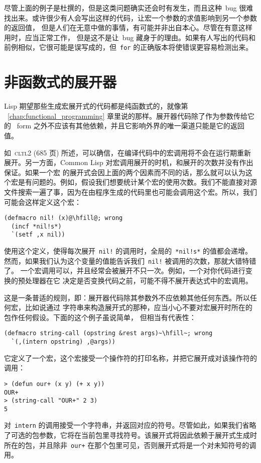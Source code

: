 尽管上面的例子是杜撰的，但是这类问题确实还会时有发生，而且这种~bug
很难找出来。或许很少有人会写出这样的代码，让宏一个参数的求值影响到另一个参数的返回值，
但是人们在无意中做的事情，有可能并非出自本心。尽管在有意这样用时，应当正常工作，
但是这不是让~bug 藏身于\utility{}的理由。如果有人写出的代码和前例相似，它很可能是误写成的，但~\texttt{for}
的正确版本将使错误更容易检测出来。

\section{非函数式的展开器}
\label{sec:non-functional_expanders}

Lisp 期望那些生成宏展开式的代码都是纯函数式的，就像第%
~\ref{chap:functional_programming} 章里说的那样。展开器代码除了作为参数传给它的
~form 之外不应该有其他依赖，并且它影响外界的唯一渠道只能是它的返回值。

如~\textsc{cltl}2 (685 页) 所述，可以确信，在编译代码中的宏调用将不会在运行期重新
展开。另一方面，Common Lisp 对宏调用展开的时机，和展开的次数并没有作出保证。如果一个宏
的展开式会因上面的两个因素而不同的话，那么就可以认为这个宏是有问题的。例如，假设我们想要统计某个宏的使用次数。我们不能直接对源文件搜索一遍了事，因为在由程序生成的代码里也可能会调用这个宏。所以，我们
可能会这样定义这个宏：
\begin{lstlisting}[escapechar=\@]
(defmacro nil! (x)@\hfill@; wrong
  (incf *nil!s*)
  `(setf ,x nil))
\end{lstlisting}
使用这个定义，使得每次展开~\verb|nil!| 的调用时，全局的~\verb|*nil!s*| 的值都会递增。
然而，如果我们认为这个变量的值能告诉我们~\verb|nil!| 被调用的次数，那就大错特错了。
一个宏调用可以，并且经常会被展开不只一次。例如，一个对你代码进行变换的预处理器在它
决定是否变换代码之前，可能不得不展开表达式中的宏调用。

这是一条普适的规则，即：展开器代码除其参数外不应依赖其他任何东西。所以任何宏，比如说通过
字符串来构造展开式的那种，应当小心不要对宏展开时所在的包作任何假设。下面的这个例子虽说简单，
但相当有代表性：
\begin{lstlisting}[escapechar=\~]
(defmacro string-call (opstring &rest args)~\hfill~; wrong
  `(,(intern opstring) ,@args))
\end{lstlisting}
它定义了一个宏，这个宏接受一个操作符的打印名称，并把它展开成对该操作符的调用：
\begin{lstlisting}
> (defun our+ (x y) (+ x y))
OUR+
> (string-call "OUR+" 2 3)
5
\end{lstlisting}
对~\verb|intern| 的调用接受一个字符串，并返回对应的符号。尽管如此，如果我们省略了可选的包参数，它将在当前包里寻找符号。该展开式将因此依赖于展开式生成时所在的包，并且除非~\texttt{our+} 在那个包里可见，否则展开式将是一个对未知符号的调用。

